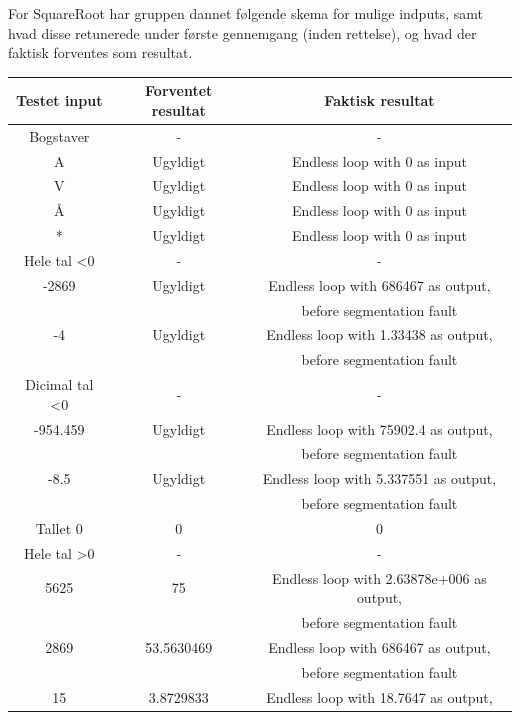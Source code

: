 \documentclass[11pt]{article}
\begin{document}
    \newpage
    \noindent
    For SquareRoot har gruppen dannet følgende skema for mulige indputs, samt hvad disse retunerede under første gennemgang (inden rettelse), og hvad der faktisk forventes som resultat.
    \begin{center}
        \begin{tabular}{ |c|c|c| }
            \hline
             Testet input & Forventet resultat & Faktisk resultat \\
            \hline
             Bogstaver & - & - \\
              A & Ugyldigt & Endless loop with 0 as input\\
              V & Ugyldigt & Endless loop with 0 as input \\
              Å & Ugyldigt & Endless loop with 0 as input \\
              * & Ugyldigt & Endless loop with 0 as input \\
             Hele tal \textless 0 & - & - \\ 
              -2869 & Ugyldigt & Endless loop with 686467 as output,\\ 
              && before segmentation fault\\
              -4 & Ugyldigt & Endless loop with 1.33438 as output,\\ 
              && before segmentation fault \\
             Dicimal tal \textless 0 & - & -\\
              -954.459 & Ugyldigt & Endless loop with 75902.4 as output,\\ 
              && before segmentation fault\\
              -8.5 & Ugyldigt & Endless loop with 5.337551 as output,\\ 
              && before segmentation fault \\
             Tallet 0 & 0 & 0 \\
             Hele tal \textgreater 0 & - & - \\
              5625 & 75 & Endless loop with 2.63878e+006 as output,\\ 
              && before segmentation fault \\
              2869 & 53.5630469 & Endless loop with 686467 as output,\\ 
              && before segmentation fault \\
              15 & 3.8729833 & Endless loop with 18.7647 as output,\\ 

\end{tabular}
\end{center}
\end{document}
